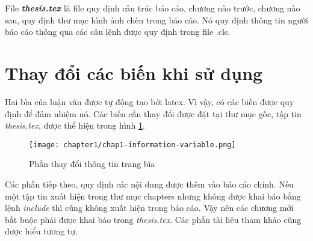 File \textbf{\textit{thesis.tex}} là file quy định cấu trúc báo cáo, chương nào trước, chương nào sau, quy định thư mục hình ảnh chèn trong báo cáo. Nó quy định thông tin người báo cáo thông qua các câu lệnh được quy định trong file .cls. 

\section{Thay đổi các biến khi sử dụng}

Hai bìa của luận văn được tự động tạo bởi latex. Vì vậy, có các biến được quy định để đảm nhiệm nó. Các biến cần thay đổi được đặt tại thư mục gốc, tập tin \textit{thesis.tex}, được thể hiện trong hình \ref{fig:chap1-information-variable}.

\begin{figure}
    \centering
    \texttt{[image: chapter1/chap1-information-variable.png]}
    \caption{Phần thay đổi thông tin trang bìa}
    \label{fig:chap1-information-variable}
\end{figure}

Các phần tiếp theo, quy định các nội dung được thêm vào báo cáo chính. Nếu một tập tin xuất hiện trong thư mục chapters nhưng không được khai báo bằng lệnh \textit{include} thì cũng không xuất hiện trong báo cáo. Vậy nên các chương mới bắt buộc phải được khai báo trong \textit{thesis.tex}. Các phần tài liêu tham khảo cũng được hiểu tương tự.

